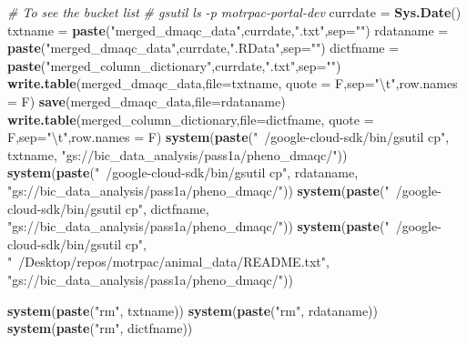 \documentclass[]{article}
\newenvironment{Shaded}{\begin{snugshade}}{\end{snugshade}}
\newcommand{\KeywordTok}[1]{\textcolor[rgb]{0.13,0.29,0.53}{\textbf{#1}}}
\newcommand{\DataTypeTok}[1]{\textcolor[rgb]{0.13,0.29,0.53}{#1}}
\newcommand{\CharTok}[1]{\textcolor[rgb]{0.31,0.60,0.02}{#1}}
\newcommand{\StringTok}[1]{\textcolor[rgb]{0.31,0.60,0.02}{#1}}
\newcommand{\CommentTok}[1]{\textcolor[rgb]{0.56,0.35,0.01}{\textit{#1}}}
\newcommand{\NormalTok}[1]{#1}
\begin{document}
\begin{Shaded}
\begin{Highlighting}[]
\CommentTok{# To see the bucket list}
\CommentTok{# gsutil ls -p motrpac-portal-dev}
\NormalTok{currdate =}\StringTok{ }\KeywordTok{Sys.Date}\NormalTok{()}
\NormalTok{txtname =}\StringTok{ }\KeywordTok{paste}\NormalTok{(}\StringTok{"merged_dmaqc_data"}\NormalTok{,currdate,}\StringTok{".txt"}\NormalTok{,}\DataTypeTok{sep=}\StringTok{""}\NormalTok{)}
\NormalTok{rdataname =}\StringTok{ }\KeywordTok{paste}\NormalTok{(}\StringTok{"merged_dmaqc_data"}\NormalTok{,currdate,}\StringTok{".RData"}\NormalTok{,}\DataTypeTok{sep=}\StringTok{""}\NormalTok{)}
\NormalTok{dictfname =}\StringTok{ }\KeywordTok{paste}\NormalTok{(}\StringTok{"merged_column_dictionary"}\NormalTok{,currdate,}\StringTok{".txt"}\NormalTok{,}\DataTypeTok{sep=}\StringTok{""}\NormalTok{)}
\KeywordTok{write.table}\NormalTok{(merged_dmaqc_data,}\DataTypeTok{file=}\NormalTok{txtname,}
            \DataTypeTok{quote =}\NormalTok{ F,}\DataTypeTok{sep=}\StringTok{"}\CharTok{\textbackslash{}t}\StringTok{"}\NormalTok{,}\DataTypeTok{row.names =}\NormalTok{ F)}
\KeywordTok{save}\NormalTok{(merged_dmaqc_data,}\DataTypeTok{file=}\NormalTok{rdataname)}
\KeywordTok{write.table}\NormalTok{(merged_column_dictionary,}\DataTypeTok{file=}\NormalTok{dictfname,}
            \DataTypeTok{quote =}\NormalTok{ F,}\DataTypeTok{sep=}\StringTok{"}\CharTok{\textbackslash{}t}\StringTok{"}\NormalTok{,}\DataTypeTok{row.names =}\NormalTok{ F)}
\KeywordTok{system}\NormalTok{(}\KeywordTok{paste}\NormalTok{(}\StringTok{"~/google-cloud-sdk/bin/gsutil cp"}\NormalTok{, txtname,}
             \StringTok{"gs://bic_data_analysis/pass1a/pheno_dmaqc/"}\NormalTok{))}
\KeywordTok{system}\NormalTok{(}\KeywordTok{paste}\NormalTok{(}\StringTok{"~/google-cloud-sdk/bin/gsutil cp"}\NormalTok{, rdataname,}
             \StringTok{"gs://bic_data_analysis/pass1a/pheno_dmaqc/"}\NormalTok{))}
\KeywordTok{system}\NormalTok{(}\KeywordTok{paste}\NormalTok{(}\StringTok{"~/google-cloud-sdk/bin/gsutil cp"}\NormalTok{, dictfname,}
             \StringTok{"gs://bic_data_analysis/pass1a/pheno_dmaqc/"}\NormalTok{))}
\KeywordTok{system}\NormalTok{(}\KeywordTok{paste}\NormalTok{(}\StringTok{"~/google-cloud-sdk/bin/gsutil cp"}\NormalTok{, }
             \StringTok{"~/Desktop/repos/motrpac/animal_data/README.txt"}\NormalTok{,}
             \StringTok{"gs://bic_data_analysis/pass1a/pheno_dmaqc/"}\NormalTok{))}

\KeywordTok{system}\NormalTok{(}\KeywordTok{paste}\NormalTok{(}\StringTok{"rm"}\NormalTok{, txtname))}
\KeywordTok{system}\NormalTok{(}\KeywordTok{paste}\NormalTok{(}\StringTok{"rm"}\NormalTok{, rdataname))}
\KeywordTok{system}\NormalTok{(}\KeywordTok{paste}\NormalTok{(}\StringTok{"rm"}\NormalTok{, dictfname))}
\end{Highlighting}
\end{Shaded}
\end{document}
